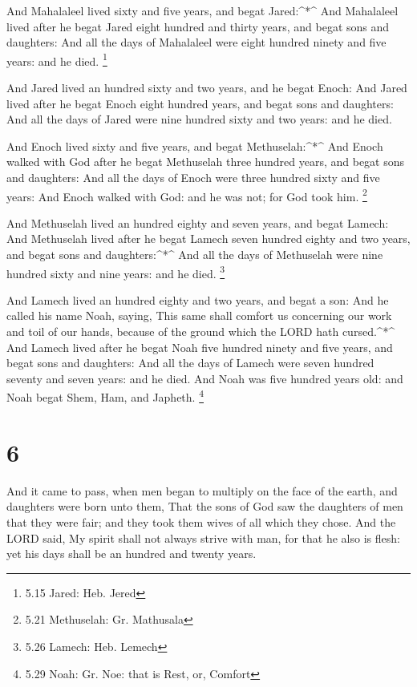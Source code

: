  And Mahalaleel lived sixty and five years, and begat
Jared:\^{}*\^{}  And Mahalaleel lived after he begat Jared
eight hundred and thirty years, and begat sons and daughters:
 And all the days of Mahalaleel were eight hundred ninety
and five years: and he died. \footnote{5.15 Jared: Heb. Jered}

 And Jared lived an hundred sixty and two years, and he
begat Enoch:  And Jared lived after he begat Enoch eight
hundred years, and begat sons and daughters:  And all the
days of Jared were nine hundred sixty and two years: and he died.

 And Enoch lived sixty and five years, and begat
Methuselah:\^{}*\^{}  And Enoch walked with God after he
begat Methuselah three hundred years, and begat sons and daughters:
 And all the days of Enoch were three hundred sixty and
five years:  And Enoch walked with God: and he was not; for
God took him. \footnote{5.21 Methuselah: Gr. Mathusala}

 And Methuselah lived an hundred eighty and seven years,
and begat Lamech:  And Methuselah lived after he begat
Lamech seven hundred eighty and two years, and begat sons and
daughters:\^{}*\^{}  And all the days of Methuselah were
nine hundred sixty and nine years: and he died. \footnote{5.26 Lamech:
  Heb. Lemech}

 And Lamech lived an hundred eighty and two years, and
begat a son:  And he called his name Noah, saying, This
same shall comfort us concerning our work and toil of our hands, because
of the ground which the LORD hath cursed.\^{}*\^{}  And
Lamech lived after he begat Noah five hundred ninety and five years, and
begat sons and daughters:  And all the days of Lamech were
seven hundred seventy and seven years: and he died.  And
Noah was five hundred years old: and Noah begat Shem, Ham, and Japheth.
\footnote{5.29 Noah: Gr. Noe: that is Rest, or, Comfort}

\hypertarget{section-5}{%
\section{6}\label{section-5}}

 And it came to pass, when men began to multiply on the face
of the earth, and daughters were born unto them,  That the
sons of God saw the daughters of men that they were fair; and they took
them wives of all which they chose.  And the LORD said, My
spirit shall not always strive with man, for that he also is flesh: yet
his days shall be an hundred and twenty years.

